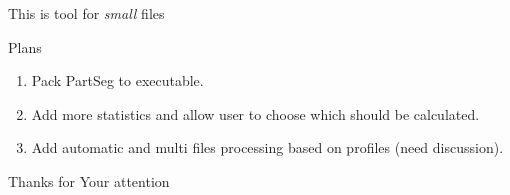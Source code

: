 \documentclass[10pt,usenames,dvipsnames]{beamer}
\begin{document}
\begin{frame}[standout]{}
  This is tool for \emph{small} files  
\end{frame}
\begin{frame}[c]{Plans}
  \begin{enumerate}
    \item Pack PartSeg to executable. 
    \item Add more statistics and allow user to choose which should be calculated.
    \item Add automatic and multi files processing based on profiles (need discussion).
  \end{enumerate}  
\end{frame}
\begin{frame}
  \begin{center}
    \Huge Thanks for Your attention
  \end{center}
\end{frame}
\end{document}
